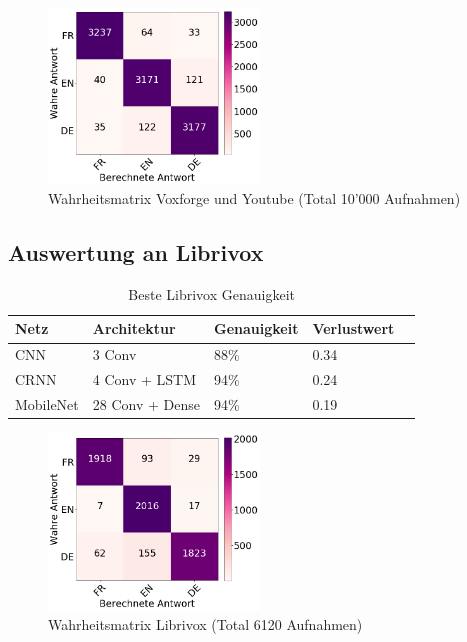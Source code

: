  \begin{figure}[hbt]
	\centering
		\includegraphics[width=0.5\textwidth]{assets/matrix_vox.png}
	\caption{Wahrheitsmatrix Voxforge und Youtube (Total 10'000 Aufnahmen)}
	\label{img:matrix_vox}
\end{figure}

\subsection{Auswertung an Librivox}

\begin{table}[h]
	\centering
	\begin{tabular}{lllll}
		\hline
		Netz & Architektur     & Genauigkeit & Verlustwert \\ \hline
		CNN  & 3 Conv          & 88\%     & 0.34  \\
		CRNN & 4 Conv + LSTM   & 94\%     & 0.24  \\
		MobileNet  & 28 Conv + Dense & 94\%     & 0.19  \\ \hline
	\end{tabular}
	\caption{Beste Librivox Genauigkeit}
	\label{table:test_lib}
\end{table}

 \begin{figure}[hbt]
	\centering
		\includegraphics[width=0.5\textwidth]{assets/matrix_lib.png}
	\caption{Wahrheitsmatrix Librivox (Total 6120 Aufnahmen)}
	\label{img:matrix_lib}
\end{figure}
